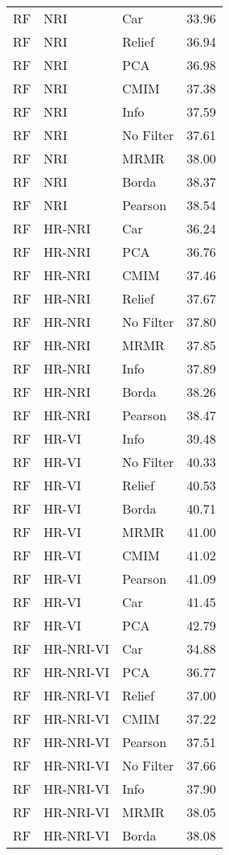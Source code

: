 \begin{longtable}{lllr}
  RF & NRI & Car & 33.96 \\ 
  RF & NRI & Relief & 36.94 \\ 
  RF & NRI & PCA & 36.98 \\ 
  RF & NRI & CMIM & 37.38 \\ 
  RF & NRI & Info & 37.59 \\ 
  RF & NRI & No Filter & 37.61 \\ 
  RF & NRI & MRMR & 38.00 \\ 
  RF & NRI & Borda & 38.37 \\ 
  RF & NRI & Pearson & 38.54 \\ 
  RF & HR-NRI & Car & 36.24 \\ 
  RF & HR-NRI & PCA & 36.76 \\ 
  RF & HR-NRI & CMIM & 37.46 \\ 
  RF & HR-NRI & Relief & 37.67 \\ 
  RF & HR-NRI & No Filter & 37.80 \\ 
  RF & HR-NRI & MRMR & 37.85 \\ 
  RF & HR-NRI & Info & 37.89 \\ 
  RF & HR-NRI & Borda & 38.26 \\ 
  RF & HR-NRI & Pearson & 38.47 \\ 
  RF & HR-VI & Info & 39.48 \\ 
  RF & HR-VI & No Filter & 40.33 \\ 
  RF & HR-VI & Relief & 40.53 \\ 
  RF & HR-VI & Borda & 40.71 \\ 
  RF & HR-VI & MRMR & 41.00 \\ 
  RF & HR-VI & CMIM & 41.02 \\ 
  RF & HR-VI & Pearson & 41.09 \\ 
  RF & HR-VI & Car & 41.45 \\ 
  RF & HR-VI & PCA & 42.79 \\ 
  RF & HR-NRI-VI & Car & 34.88 \\ 
  RF & HR-NRI-VI & PCA & 36.77 \\ 
  RF & HR-NRI-VI & Relief & 37.00 \\ 
  RF & HR-NRI-VI & CMIM & 37.22 \\ 
  RF & HR-NRI-VI & Pearson & 37.51 \\ 
  RF & HR-NRI-VI & No Filter & 37.66 \\ 
  RF & HR-NRI-VI & Info & 37.90 \\ 
  RF & HR-NRI-VI & MRMR & 38.05 \\ 
  RF & HR-NRI-VI & Borda & 38.08 \\ 

\end{longtable}
